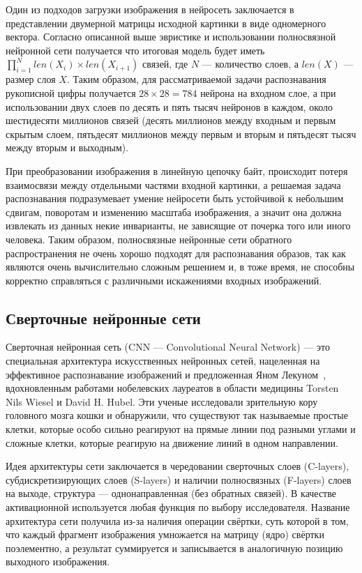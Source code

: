 \documentclass[a4paper,14pt]{extarticle} %
\begin{document}
Один из подходов загрузки изображения в нейросеть заключается в представлении двумерной матрицы исходной картинки в виде одномерного вектора. Согласно описанной выше эвристике и использовании полносвязной нейронной сети получается что итоговая модель будет иметь $\prod_{i=1}^{N} len(X_i)\times len(X_{i+1})$ связей, где $N$ --- количество слоев, а $len(X)$ --- размер слоя $X$. Таким образом, для рассматриваемой задачи распознавания рукописной цифры получается $28\times28=784$ нейрона на входном слое, а при использовании двух слоев по десять и пять тысяч нейронов в каждом, около шестидесяти миллионов связей (десять миллионов между входным и первым скрытым слоем, пятьдесят миллионов между первым и вторым и пятьдесят тысяч между вторым и выходным).

При преобразовании изображения в линейную цепочку байт, происходит потеря взаимосвязи между отдельными частями входной картинки, а решаемая задача распознавания подразумевает умение нейросети быть устойчивой к небольшим сдвигам, поворотам и изменению масштаба изображения, а значит она должна извлекать из данных некие инварианты, не зависящие от почерка того или иного человека. Таким образом, полносвязные нейронные сети обратного распространения не очень хорошо подходят для распознавания образов, так как являются очень вычислительно сложным решением и, в тоже время, не способны корректно справляться с различными искажениями входных изображений.

\subsection{Сверточные нейронные сети}
\hspace{\parindent} Сверточная нейронная сеть (CNN --- Convolutional Neural Network) --- это специальная архитектура искусственных нейронных сетей, нацеленная на эффективное распознавание изображений и предложенная Яном Лекуном~\cite{lecuncomparison}, вдохновленным работами нобелевских лауреатов в области медицины Torsten Nils Wiesel и David H. Hubel. Эти ученые исследовали зрительную кору головного мозга кошки и обнаружили, что существуют так называемые простые клетки, которые особо сильно реагируют на прямые линии под разными углами и сложные клетки, которые реагирую на движение линий в одном направлении. 

Идея архитектуры сети заключается в чередовании сверточных слоев (C-layers), субдискретизирующих слоев (S-layers) и наличии полносвязных (F-layers) слоев на выходе, структура --- однонаправленная (без обратных связей). В качестве активационной используется любая функция по выбору исследователя. Название архитектура сети получила из-за наличия операции свёртки, суть которой в том, что каждый фрагмент изображения умножается на матрицу (ядро) свёртки поэлементно, а результат суммируется и записывается в аналогичную позицию выходного изображения.
\end{document}
